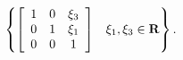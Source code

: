\begin{equation}
\left\{
\left[
\begin{array}{ccc}
 1 & 0 & \xi_3 \\ 0 & 1 & \xi_1 \\ 0 & 0 &1
\end{array}
\right]
 \,\,\,\,\,\xi_{1}, \xi_{3} \in \bf R \right\}.
\end{equation}

